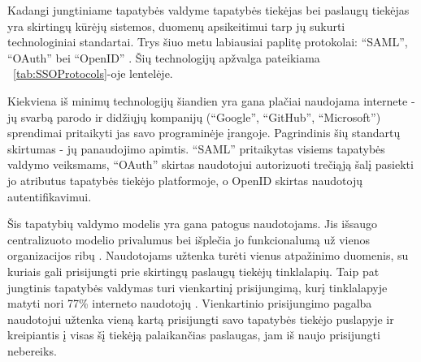 
Kadangi jungtiniame tapatybės valdyme tapatybės tiekėjas bei paslaugų tiekėjas yra skirtingų kūrėjų sistemos,
duomenų apsikeitimui tarp jų sukurti technologiniai standartai. Trys šiuo metu labiausiai paplitę protokolai: \enquote{SAML}, \enquote{OAuth} bei \enquote{OpenID}
\cite{OIDvsOAuthvsSAML}. Šių technologijų
apžvalga pateikiama \hypertarget{tab:SSOProtocols}{~\ref{tab:SSOProtocols}}-oje lentelėje.



Kiekviena iš minimų technologijų šiandien yra gana plačiai naudojama internete - jų svarbą parodo
ir didžiųjų kompanijų (\enquote{Google}, \enquote{GitHub}, \enquote{Microsoft}) sprendimai pritaikyti jas savo
programinėje įrangoje. Pagrindinis šių standartų skirtumas - jų panaudojimo apimtis. \enquote{SAML} pritaikytas visiems tapatybės valdymo
veiksmams, \enquote{OAuth} skirtas naudotojui autorizuoti trečiąją šalį pasiekti jo atributus tapatybės tiekėjo platformoje,
o OpenID skirtas naudotojų autentifikavimui.


Šis tapatybių valdymo modelis yra gana patogus naudotojams. Jis išsaugo centralizuoto modelio privalumus 
bei išplečia jo funkcionalumą už vienos organizacijos ribų \cite{OIDvsOAuthvsSAML}. Naudotojams užtenka turėti vienus atpažinimo duomenis, su kuriais
gali prisijungti prie skirtingų paslaugų tiekėjų tinklalapių. Taip pat jungtinis tapatybės valdymas turi vienkartinį prisijungimą,
kurį tinklalapyje matyti nori 77\% interneto naudotojų \cite{SSOResearch}. Vienkartinio prisijungimo pagalba naudotojui užtenka vieną kartą
prisijungti savo tapatybės tiekėjo puslapyje ir kreipiantis į visas šį tiekėją palaikančias paslaugas, jam iš naujo prisijungti nebereiks.

